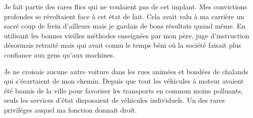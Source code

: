 Je fait partie des rares flics qui ne voulaient pas de cet implant. Mes
convictions profondes se révoltaient face à cet état de fait. Cela avait valu à
ma carrière un sacré coup de frein d'ailleurs mais je gardais de bons résultats
quand même. En utilisant les bonnes vieilles méthodes enseignées par mon père,
juge d'instruction désormais retraité mais qui avait connu le temps béni où la
société faisait plus confiance aux gens qu'aux machines.

Je ne croisais aucune autre voiture dans les rues animées et bondées de
chalands qui s'écartaient de mon chemin. Depuis que tout les véhicules à moteur
avaient été bannis de la ville pour favoriser les transports en commun moins
polluants, seuls les services d'état disposaient de véhicules individuels. Un
des rares privilèges auquel ma fonction donnait droit.